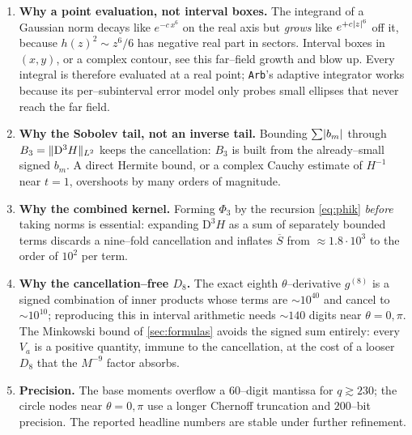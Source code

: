 \documentclass[12pt]{article}
\newcommand{\Dop}{\mathrm{D}}              %
\begin{document}
\begin{enumerate}[leftmargin=1.6em]
\item \textbf{Why a point evaluation, not interval boxes.}  The integrand of a
Gaussian norm decays like $e^{-c\,x^6}$ on the real axis but \emph{grows} like
$e^{+c\lvert z\rvert^6}$ off it, because $h(z)^2\sim z^6/6$ has negative real part in
sectors.  Interval boxes in $(x,y)$, or a complex contour, see this far--field
growth and blow up.  Every integral is therefore evaluated at a real point;
\texttt{Arb}'s adaptive integrator works because its per--subinterval error model
only probes small ellipses that never reach the far field.

\item \textbf{Why the Sobolev tail, not an inverse tail.}  Bounding $\sum\lvert b_m\rvert$
through $B_3=\norm{\Dop^3H}_{L^2}$ keeps the cancellation: $B_3$ is built from the
already--small signed $b_m$.  A direct Hermite bound, or a complex Cauchy estimate
of $H^{-1}$ near $t=1$, overshoots by many orders of magnitude.

\item \textbf{Why the combined kernel.}  Forming $\Phi_3$ by the recursion
\eqref{eq:phik} \emph{before} taking norms is essential: expanding
$\Dop^3H$ as a sum of separately bounded terms discards a nine--fold cancellation
and inflates $\overline S$ from $\approx1.8\cdot10^3$ to the order of $10^2$ per
term.

\item \textbf{Why the cancellation--free $D_8$.}  The exact eighth $\theta$--derivative
$g^{(8)}$ is a signed combination of inner products whose terms are $\sim10^{40}$
and cancel to $\sim10^{10}$; reproducing this in interval arithmetic needs
$\sim140$ digits near $\theta=0,\pi$.  The Minkowski bound of
\cref{sec:formulas} avoids the signed sum entirely: every $V_a$ is a positive
quantity, immune to the cancellation, at the cost of a looser $D_8$ that the
$M^{-9}$ factor absorbs.

\item \textbf{Precision.}  The base moments overflow a $60$--digit mantissa for
$q\gtrsim230$; the circle nodes near $\theta=0,\pi$ use a longer Chernoff
truncation and $200$--bit precision.  The reported headline numbers are stable
under further refinement.
\end{enumerate}
\end{document}
